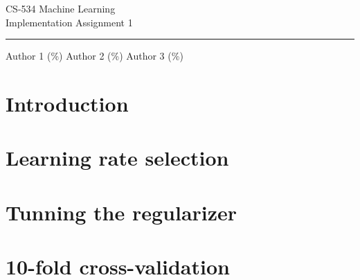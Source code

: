 \documentclass{article}
\begin{document}
\begin{center}
	{\huge CS-534 Machine Learning} \\ \vspace{2mm}
	{\Large Implementation Assignment 1} \\ \vspace{2mm} \hrule \vspace{3mm}
	{\large Author 1 (\%)} \hspace{3mm} {\large Author 2 (\%)} \hspace{3mm} {\large Author 3 (\%)} 
\end{center}

\section{Introduction}

\section{Learning rate selection}

\section{Tunning the regularizer}

\section{10-fold cross-validation}
\end{document}
